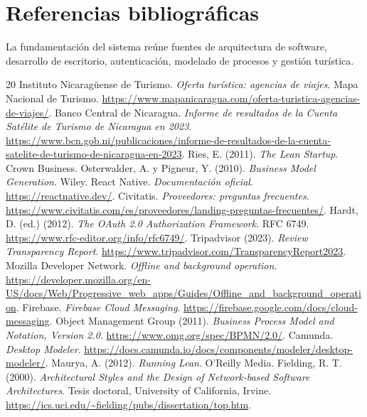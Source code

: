 \section{Referencias bibliográficas}
La fundamentación del sistema reúne fuentes de arquitectura de software, desarrollo de escritorio, autenticación, modelado de procesos y gestión turística.
\begingroup
\renewcommand{\chapter}[2]{}%
\renewcommand{\bibname}{}%
\begin{thebibliography}{20}
 Instituto Nicaragüense de Turismo. \emph{Oferta turística: agencias de viajes}. Mapa Nacional de Turismo. \url{https://www.mapanicaragua.com/oferta-turistica-agencias-de-viajes/}.
 Banco Central de Nicaragua. \emph{Informe de resultados de la Cuenta Satélite de Turismo de Nicaragua en 2023}. \url{https://www.bcn.gob.ni/publicaciones/informe-de-resultados-de-la-cuenta-satelite-de-turismo-de-nicaragua-en-2023}.
 Ries, E. (2011). \emph{The Lean Startup}. Crown Business.
 Osterwalder, A. y Pigneur, Y. (2010). \emph{Business Model Generation}. Wiley.
 React Native. \emph{Documentación oficial}. \url{https://reactnative.dev/}. 
 Civitatis. \emph{Proveedores: preguntas frecuentes}. \url{https://www.civitatis.com/es/proveedores/landing-preguntas-frecuentes/}.
 Hardt, D. (ed.) (2012). \emph{The OAuth 2.0 Authorization Framework}. RFC 6749. \url{https://www.rfc-editor.org/info/rfc6749/}.
 Tripadvisor (2023). \emph{Review Transparency Report}. \url{https://www.tripadvisor.com/TransparencyReport2023}.
 Mozilla Developer Network. \emph{Offline and background operation}. \url{https://developer.mozilla.org/en-US/docs/Web/Progressive_web_apps/Guides/Offline_and_background_operation}.
 Firebase. \emph{Firebase Cloud Messaging}. \url{https://firebase.google.com/docs/cloud-messaging}.
 Object Management Group (2011). \emph{Business Process Model and Notation, Version 2.0}. \url{https://www.omg.org/spec/BPMN/2.0/}.
 Camunda. \emph{Desktop Modeler}. \url{https://docs.camunda.io/docs/components/modeler/desktop-modeler/}.
 Maurya, A. (2012). \emph{Running Lean}. O'Reilly Media.
 Fielding, R. T. (2000). \emph{Architectural Styles and the Design of Network-based Software Architectures}. Tesis doctoral, University of California, Irvine. \url{https://ics.uci.edu/~fielding/pubs/dissertation/top.htm}.

\end{thebibliography}
